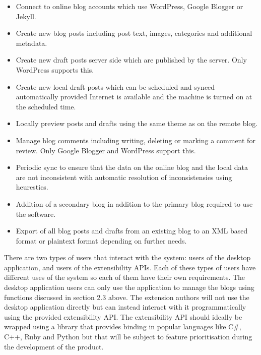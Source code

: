 \begin{itemize}
    \item {Connect to online blog accounts which use WordPress, Google Blogger or Jekyll.}
    \item {Create new blog posts including post text, images, categories and additional metadata.}
    \item {Create new draft posts server side which are published by the server. Only WordPress supports this.}
    \item {Create new local draft posts which can be scheduled and synced automatically provided Internet is available
           and the machine is turned on at the scheduled time.}
    \item {Locally preview posts and drafts using the same theme as on the remote blog.}
    \item {Manage blog comments including writing, deleting or marking a comment for review. Only Google Blogger and
           WordPress support this.}
    \item {Periodic sync to ensure that the data on the online blog and the local data are not inconsistent with
           automatic resolution of inconsistensies using heurestics.}
    \item {Addition of a secondary blog in addition to the primary blog required to use the software.}
    \item {Export of all blog posts and drafts from an existing blog to an XML based format or plaintext format
           depending on further needs.}
\end{itemize}


There are two types of users that interact with the system: users of the desktop application, and users of the
extensibility APIs. Each of these types of users have different uses of the system so each of them have their own
requirements. The desktop application users can only use the application to manage the blogs using functions discussed
in section 2.3 above. The extension authors will not use the desktop application directly but can instead interact with
it programmatically using the provided extensibility API. The extensibility API should ideally be wrapped using a
library that provides binding in popular languages like C\#, C++, Ruby and Python but that will be subject to feature
prioritisation during the development of the product.


